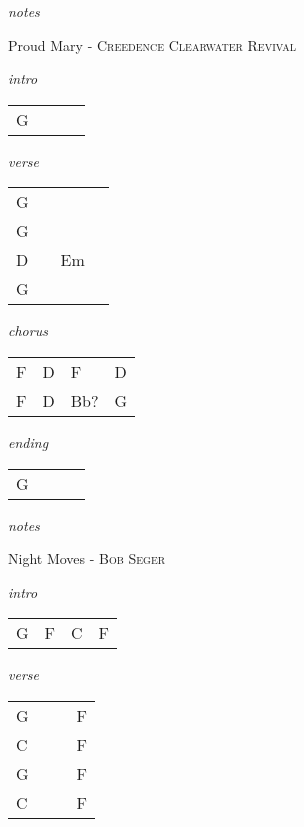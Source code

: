 \documentclass[12pt]{article}
\begin{document}
\textit{notes}

\newpage

{\Huge Proud Mary} {\normalsize - \textsc{Creedence Clearwater Revival}}

\huge
\textit{intro}

\begin{tabular}{|P{1.25in}|P{1.25in}|P{1.25in}|P{1.25in}|}
  G &   &   &   \\
\end{tabular}

\textit{verse}

\begin{tabular}{|P{1.25in}|P{1.25in}|P{1.25in}|P{1.25in}|}
  G &   &   &   \\
  G &   &   &   \\
  D &   & Em  &   \\
  G &   &   &   \\
\end{tabular}

\textit{chorus}

\begin{tabular}{|P{1.25in}|P{1.25in}|P{1.25in}|P{1.25in}|}
  F & D  & F  &  D \\
  F & D & Bb? & G  \\
\end{tabular}

\textit{ending}

\begin{tabular}{|P{1.25in}|P{1.25in}|P{1.25in}|P{1.25in}|}
  G &   &   &   \\
\end{tabular}

\textit{notes}

\newpage

{\Huge Night Moves} {\huge - \textsc{Bob Seger}}

\huge
\textit{intro}

\begin{tabular}{|P{1.25in}|P{1.25in}|P{1.25in}|P{1.25in}|}
  G & F & C & F \\
\end{tabular}

\textit{verse}

\begin{tabular}{|P{1.25in}|P{1.25in}|P{1.25in}|P{1.25in}|}
  G &   &   &  F \\
  C &   &   &  F \\
  G &   &   &  F \\
  C &   &   &  F \\
\end{tabular}
\end{document}
